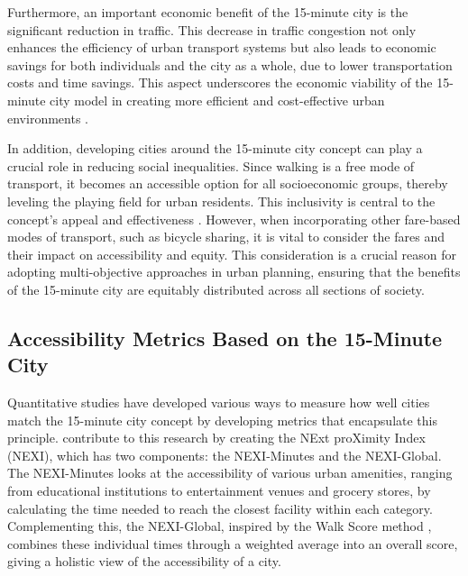 Furthermore, an important economic benefit of the 15-minute city is the significant reduction in traffic. 
This decrease in traffic congestion not only enhances the efficiency of urban transport systems but also leads to economic savings for both individuals and the city as a whole, due to lower transportation costs and time savings.
This aspect underscores the economic viability of the 15-minute city model in creating more efficient and cost-effective urban environments .

In addition, developing cities around the 15-minute city concept can play a crucial role in reducing social inequalities. 
Since walking is a free mode of transport, it becomes an accessible option for all socioeconomic groups, thereby leveling the playing field for urban residents. 
This inclusivity is central to the concept's appeal and effectiveness .
However, when incorporating other fare-based modes of transport, such as bicycle sharing, it is vital to consider the fares and their impact on accessibility and equity. 
This consideration is a crucial reason for adopting multi-objective approaches in urban planning, ensuring that the benefits of the 15-minute city are equitably distributed across all sections of society.


\subsection{Accessibility Metrics Based on the 15-Minute City}
\label{subsec:accessibility_metrics_based_on_the_15_minute_city}

Quantitative studies have developed various ways to measure how well cities match the 15-minute city concept by developing metrics that encapsulate this principle.  
 contribute to this research by creating the NExt proXimity Index (NEXI), which has two components: the NEXI-Minutes and the NEXI-Global. 
The NEXI-Minutes looks at the accessibility of various urban amenities, ranging from educational institutions to entertainment venues and grocery stores, by calculating the time needed to reach the closest facility within each category.
Complementing this, the NEXI-Global, inspired by the Walk Score method , combines these individual times through a weighted average into an overall score, giving a holistic view of the accessibility of a city.

